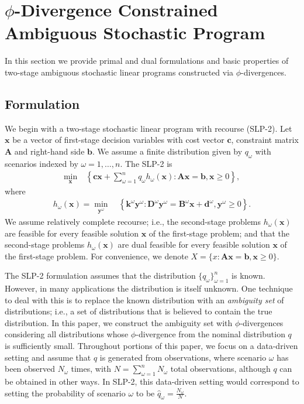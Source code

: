 \documentclass[ijoc,letterpaper]{informs3} %
\newcommand{\x}{\mathbf{x}}
\newcommand{\y}{\mathbf{y}}
\renewcommand{\c}{\mathbf{c}}
\newcommand{\A}{\mathbf{A}}
\renewcommand{\b}{\mathbf{b}}
\renewcommand{\k}{\mathbf{k}}
\newcommand{\D}{\mathbf{D}}
\newcommand{\B}{\mathbf{B}}
\renewcommand{\d}{\mathbf{d}}
\newcommand{\st}{\mbox{s.t.}}
\begin{document}
\section{$\phi$-Divergence Constrained Ambiguous Stochastic Program}
\label{sec:plp2}

In this section we provide primal and dual formulations and basic properties of two-stage ambiguous stochastic linear programs constructed via $\phi$-divergences.

\subsection{Formulation}
\label{ssec:form}

We begin with a two-stage stochastic linear program with recourse (SLP-2).
Let $\x$ be a vector of first-stage decision variables with cost vector $\c$, constraint matrix $\A$ and right-hand side $\b$.
We assume a finite distribution given by $q_\omega$ with scenarios indexed by $\omega = 1, \dots, n$.
The SLP-2 is
\begin{align}
	\min_\x \ & \left\{ \c\x + \sum_{\omega=1}^n q_\omega h_\omega(\x) : \A\x = \b, \x \geq 0 \right\}, \label{eq:slp_first_stage}%
\end{align}
where
\begin{align}
	h_\omega(\x) = \min_{\y^\omega} \ & \left\{ \k^\omega \y^\omega : \D^\omega \y^\omega = \B^\omega \x + \d^\omega, \y^\omega \geq 0 \right\}. \label{eq:slp_second_stage}
\end{align}
We assume relatively complete recourse; i.e., the second-stage problems $h_\omega(\x)$ are feasible for every feasible solution $\x$ of the first-stage problem; and that the second-stage problems $h_\omega(\x)$ are dual feasible for every feasible solution $\x$ of the first-stage problem.
For convenience, we denote $X = \{x : \A\x = \b, \x \geq 0\}$.

The SLP-2 formulation assumes that the distribution $\{q_\omega\}_{\omega=1}^n$ is known.
However, in many applications the distribution is itself unknown.
One technique to deal with this is to replace the known distribution with an {\it ambiguity set} of distributions; i.e., a set of distributions that is believed to contain the true distribution.
In this paper, we construct the ambiguity set with $\phi$-divergences considering all distributions whose $\phi$-divergence from the nominal distribution $q$ is sufficiently small.
Throughout portions of this paper, we focus on a data-driven setting and assume that $q$ is generated from observations, where scenario $\omega$ has been observed $N_\omega$ times, with $N = \sum_{\omega=1}^n N_\omega$ total observations, although $q$ can be obtained in other ways.
In SLP-2, this data-driven setting would correspond to setting the probability of scenario $\omega$ to be $\hat{q}_\omega = \frac{N_\omega}{N}$.
\end{document}
